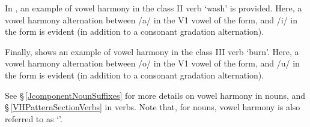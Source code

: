 In , an example of vowel harmony in the class II verb  ‘wash’ is provided. Here, a vowel harmony alternation between /a/ in the V1 vowel of the  form, and /i/ in the  form is evident (in addition to a consonant gradation alternation). 
\ea\label{vhEx2}%
\z

Finally,  shows an example of vowel harmony in the class III verb  ‘burn’. Here, a vowel harmony alternation between /o/ in the V1 vowel of the  form, and /u/ in the  form is evident (in addition to a consonant gradation alternation). 
\ea\label{vhEx3}%
\z


See §\,\ref{JcomponentNounSuffixes} for more details on vowel harmony in nouns, and §\,\ref{VHPatternSectionVerbs} in verbs. Note that, for nouns, vowel harmony is also referred to as ‘\jvh’.


\FB




